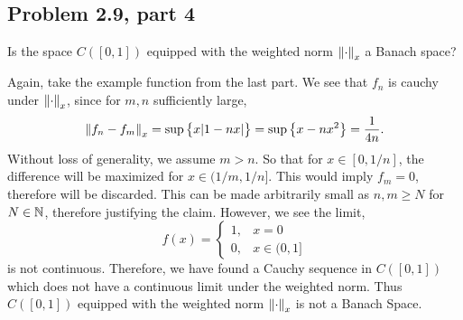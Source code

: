 \newpage
\subsection{Problem 2.9, part 4}
Is the space $C([0, 1])$ equipped with the weighted norm $\norm{\cdot}_x$ a Banach space?
\partbreak
\begin{solution}

    Again, take the example function from the last part. We see that $f_n$ is cauchy under $\norm{\cdot}_x$, since for $m, n$ sufficiently large,
    \[\norm{f_n - f_m}_x = \sup\big \{ x|1 - nx| \big \} = \sup\big \{ x - nx^2 \big \} = \frac{1}{4n}.\]
    Without loss of generality, we assume $m > n$. So that for $x \in [0, 1/n]$, the difference will be maximized for $x \in (1/m, 1/n]$. This would imply $f_m = 0$, therefore will be discarded. This can be made arbitrarily small as $n, m \geq N$ for $N \in \mathbb{N}$, therefore justifying the claim. However, we see the limit, 
    \[
    f(x) = \begin{cases}
        1, &x = 0\\
        0, & x \in (0, 1]
    \end{cases}
    \]
    is not continuous. Therefore, we have found a Cauchy sequence in $C([0, 1])$ which does not have a continuous limit under the weighted norm. Thus $C([0, 1])$ equipped with the weighted norm $\norm{\cdot}_x$ is not a Banach Space. 
\end{solution}
\newpage
